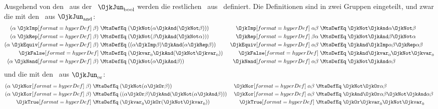 {Ausgehend von den \Junktoren\ aus der \BooleschenSignatur\ $\OjkJun_{\RawMtsIdxBool}$ werden die restlichen \Junktoren\ aus \OjkJun\ definiert.
Die Definitionen sind in zwei Gruppen eingeteilt, und zwar die mit den \Junktoren\ aus $\OjkJun_{\RawMtsIdxAnd}$:
\begin{align}
(\alpha \defSymBin{\OjkImp}   \beta) &\;\MtsDefEq\; (\OjkNot (\alpha \OjkAnd  (\OjkNot \beta))) &
\defSymBin{\OjkImp}  \alpha   \beta  &\;\MtsDefEq\;  \OjkNot    \OjkAnd \alpha \OjkNot \beta
\label{def:imp}
\\
(\alpha \defSymBin{\OjkRep}   \beta) &\;\MtsDefEq\; (\OjkNot (\beta \OjkAnd  (\OjkNot \alpha))) &
\defSymBin{\OjkRep}   \beta  \alpha  &\;\MtsDefEq\;  \OjkNot    \OjkAnd \beta \OjkNot \alpha
\label{def:rep}
\\
(\alpha \defSymBin{\OjkEquiv} \beta) &\;\MtsDefEq\; ((\alpha \OjkImp \beta) \OjkAnd (\alpha \OjkRep \beta)) &
\defSymBin{\OjkEquiv} \alpha  \beta  &\;\MtsDefEq\; \OjkAnd \OjkImp \alpha \beta \OjkRep \alpha \beta
\label{def:equiv}
\\
\defSym{\OjkFalse}                   &\;\MtsDefEq\; (\Ojkvar_0 \OjkAnd (\OjkNot \Ojkvar_0)) &
\defSym{\OjkFalse}                   &\;\MtsDefEq\;  \OjkAnd \Ojkvar_0  \OjkNot \Ojkvar_0   \label{def:false}
\\
(\alpha \defSymBin{\OjkNand}  \beta) &\;\MtsDefEq\; (\OjkNot (\alpha \OjkAnd \beta )) &
\defSymBin{\OjkNand}  \alpha  \beta  &\;\MtsDefEq\;  \OjkNot  \OjkAnd \alpha \beta \label{def:nand}
\end{align}
und die mit den \Junktoren\ aus $\OjkJun_{\RawMtsIdxOr}$:
\begin{align}
(\alpha \defSymBin{\OjkNor}   \beta) & \;\MtsDefEq\; (\OjkNot (\alpha \OjkOr \beta))   &
\defSymBin{\OjkNor}   \alpha  \beta  & \;\MtsDefEq\;  \OjkNot  \OjkOr \alpha \beta \label{def:nor}
\\
(\alpha \defSymBin{\OjkXor}   \beta) & \;\MtsDefEq\; ((\alpha \OjkOr \beta) \OjkAnd (\OjkNot (\alpha \OjkAnd \beta)))&
\defSymBin{\OjkXor}   \alpha  \beta  & \;\MtsDefEq\;  \OjkAnd \OjkOr\alpha\beta \OjkNot \OjkAnd \alpha \beta
\label{def:add}
\\
\defSym{\OjkTrue} & \;\MtsDefEq\; (\Ojkvar_0 \OjkOr (\OjkNot \Ojkvar_0)) &
\defSym{\OjkTrue} & \;\MtsDefEq\;  \OjkOr \Ojkvar_0  \OjkNot \Ojkvar_0
\label{def:true}
\end{align}

}
